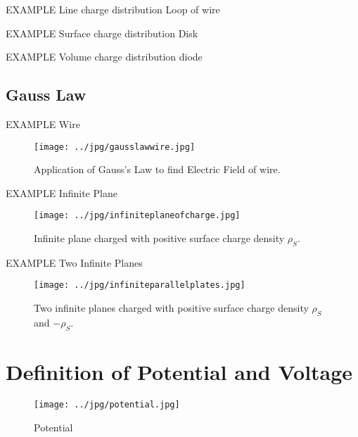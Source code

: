 {\large EXAMPLE} Line charge distribution Loop of wire

{\large EXAMPLE} Surface charge distribution Disk

{\large EXAMPLE} Volume charge distribution diode


\subsection{Gauss Law}




{\large EXAMPLE} Wire


\begin{figure}[htbp]
\begin{center}
\texttt{[image: ../jpg/gausslawwire.jpg]}
\end{center}
\caption{Application of Gauss's Law to find Electric Field of wire.}
\label{GausLine}
\end{figure}





{\large EXAMPLE} Infinite Plane


\begin{figure}[htbp]
\begin{center}
\texttt{[image: ../jpg/infiniteplaneofcharge.jpg]}
\end{center}
\caption{Infinite plane charged with positive surface charge density $\rho_S$.}
\label{GausPlane}
\end{figure}




{\large EXAMPLE} Two Infinite Planes




\begin{figure}[htbp]
\begin{center}
\texttt{[image: ../jpg/infiniteparallelplates.jpg]}
\end{center}
\caption{Two infinite planes charged with positive surface charge density $\rho_S$ and $-\rho_S.$}
\label{Gaus2Plane}
\end{figure}





\section{Definition of Potential and Voltage}



\begin{figure}[htbp]
\begin{center}
\texttt{[image: ../jpg/potential.jpg]}
\end{center}
\caption{Potential}
\label{Potential}
\end{figure}






